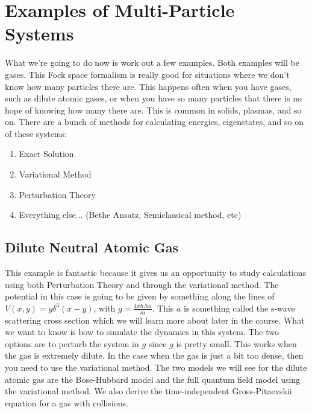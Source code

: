 \documentclass{article}
\begin{document}
\section{Examples of Multi-Particle Systems}
What we're going to do now is work out a few examples. Both examples will be gases. This Fock space formalism is really good for situations where we don't know how many particles there are. This happens often when you have gases, such as dilute atomic gases, or when you have so many particles that there is no hope of knowing how many there are. This is common in solids, plasmas, and so on. There are a bunch of methods for calculating energies, eigenstates, and so on of these systems:
\begin{enumerate}
\item Exact Solution 
\item Variational Method
\item Perturbation Theory
\item Everything else... (Bethe Ansatz, Semiclassical method, etc)
\end{enumerate}

\subsection{Dilute Neutral Atomic Gas}
This example is fantastic because it gives us an opportunity to study calculations using both Perturbation Theory and through the variational method. The potential in this case is going to be given by something along the lines of $V(x,y) = g\delta^3(x-y)$, with $g = \frac{4\pi\hbar N a}{m}$. This $a$ is something called the s-wave scattering cross section which we will learn more about later in the course. What we want to know is how to simulate the dynamics in this system. The two options are to perturb the system in $g$ since $g$ is pretty small. This works when the gas is extremely dilute. In the case when the gas is just a bit too dense, then you need to use the variational method. The two models we will see for the dilute atomic gas are the Bose-Hubbard model and the full quantum field model using the variational method. We also derive the time-independent Gross-Pitaevskii equation for a gas with collisions.
\end{document}
